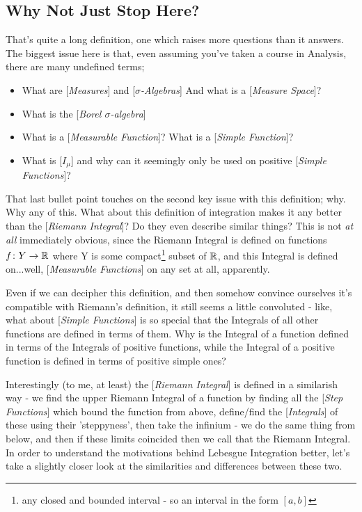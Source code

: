 \subsection{Why Not Just Stop Here?}
That's quite a long definition, one which raises more questions than it answers. The biggest issue here is that, even assuming you've taken a course in Analysis, there are many undefined terms;
\begin{itemize}
	\item What are [\emph{Measures}] and [\emph{$\sigma$-Algebras}] And what is a [\emph{Measure Space}]?
	\item What is the [\emph{Borel $\sigma$-algebra}]
	\item What is a [\emph{Measurable Function}]? What is a [\emph{Simple Function}]?
	\item What is [\emph{$I_\mu$}] and why can it seemingly only be used on positive [\emph{Simple Functions}]?
\end{itemize}

That last bullet point touches on the second key issue with this definition; why. Why any of this. What about this definition of integration makes it any better than the [\emph{Riemann Integral}]? Do they even describe similar things? This is not {\em at all} immediately obvious, since the Riemann Integral is defined on functions $f\colon Y \rightarrow \mathbb{R}$ where Y is some compact\footnote{any closed and bounded interval - so an interval in the form $[a, b]$} subset of $\mathbb{R}$, and this Integral is defined on...well, [\emph{Measurable Functions}] on any set at all, apparently.

Even if we can decipher this definition, and then somehow convince ourselves it's compatible with Riemann's definition, it still seems a little convoluted - like, what about [\emph{Simple Functions}] is so special that the Integrals of all other functions are defined in terms of them. Why is the Integral of a function defined in terms of the Integrals of positive functions, while the Integral of a positive function is defined in terms of positive simple ones?

Interestingly (to me, at least) the [\emph{Riemann Integral}] is defined in a similarish way - we find the upper Riemann Integral of a function by finding all the [\emph{Step Functions}] which bound the function from above, define/find the [\emph{Integrals}] of these using their 'steppyness', then take the infinium - we do the same thing from below, and then if these limits coincided then we call that the Riemann Integral. In order to understand the motivations behind Lebesgue Integration better, let's take a slightly closer look at the similarities and differences between these two.
